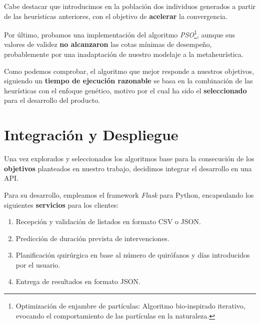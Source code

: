  Cabe destacar que introducimos en la población dos individuos generados a partir de las heurísticas anteriores, con el objetivo de \textbf{acelerar} la convergencia.

 Por último, probamos una implementación del algoritmo \textit{PSO}\footnote{Optimización de enjambre de partículas:  Algoritmo bio-inspirado iterativo, evocando el comportamiento de las partículas en la naturaleza.}, aunque sus valores de validez \textbf{no alcanzaron }las cotas mínimas de desempeño, probablemente por una inadaptación de nuestro modelaje a la metaheurística.


 Como podemos comprobar, el algoritmo que mejor responde a nuestros objetivos, siguiendo un \textbf{tiempo de ejecución razonable} se basa en la combinación de las heurísticas con el enfoque genético, motivo por el cual ha sido el \textbf{seleccionado} para el desarrollo del producto.


 \newpage

 \section{Integración y Despliegue}

 Una vez explorados y seleccionados los algoritmos base para la consecución de los \textbf{objetivos} planteados en nuestro trabajo, decidimos integrar el desarrollo en una API.

 Para su desarrollo, empleamos el framework \textit{Flask}\cite{Grinberg2018FlaskPython} para Python, encapsulando los siguientes \textbf{servicios} para los clientes:
 
 \begin{enumerate}
     \item Recepción y validación de listados en formato CSV o JSON.
     \item Predicción de duración prevista de intervenciones.
     \item Planificación quirúrgica en base al número de quirófanos y días introducidos por el usuario.
     \item Entrega de resultados en formato JSON.
 \end{enumerate}

